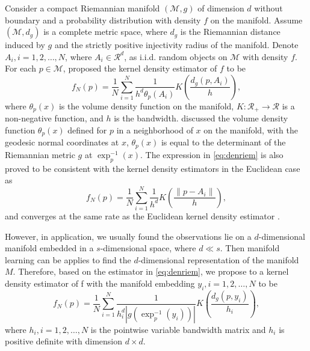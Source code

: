 \documentclass[11pt,a4paper,]{article}
\begin{document}
Consider a compact Riemannian manifold \((\mathcal{M}, g)\) of dimension \(d\) without boundary and a probability distribution with density \(f\) on the manifold. Assume \((\mathcal{M}, d_g)\) is a complete metric space, where \(d_g\) is the Riemannian distance induced by \(g\) and the strictly positive injectivity radius \autocite{Chavel2006-mp} of the manifold. Denote \(A_i, i = 1, 2, \dots, N\), where \(A_i \in \mathcal{R}^d\), as i.i.d. random objects on \(\mathcal{M}\) with density \(f\). For each \(p\in \mathcal{M}\), \textcite{Pelletier2005-vu} proposed the kernel density estimator of \(f\) to be
\begin{equation}
\label{eq:denriem}
f_N(p) = \frac{1}{N} \sum_{i=1}^{N} \frac{1}{h^d \theta_p(A_i)} K(\frac{d_g(p, A_i)}{h}),
\end{equation}
where \(\theta_p(x)\) is the volume density function on the manifold, \(K: \mathcal{R}_{+} \rightarrow \mathcal{R}\) is a non-negative function, and \(h\) is the bandwidth.
\textcite{Pelletier2005-vu} discussed the volume density function \(\theta_p(x)\) defined for \(p\) in a neighborhood of \(x\) on the manifold, with the geodesic normal coordinates at \(x\), \(\theta_p(x)\) is equal to the determinant of the Riemannian metric \(g\) at \(\exp_p^{-1}(x)\). The expression in \eqref{eq:denriem} is also proved to be consistent with the kernel density estimators in the Euclidean case as
\begin{equation}
\label{eq:denconsist}
f_N(p) = \frac{1}{N} \sum_{i=1}^{N} \frac{1}{h^d} K(\frac{\|p-A_i\|}{h}),
\end{equation}
and converges at the same rate as the Euclidean kernel density estimator \autocite{Henry2009-ll}.

However, in application, we usually found the observations lie on a \(d\)-dimensional manifold embedded in a \(s\)-dimensional space, where \(d \ll s\). Then manifold learning can be applies to find the \(d\)-dimensional representation of the manifold \(M\). Therefore, based on the estimator in \eqref{eq:denriem}, we propose to a kernel density estimator of f with the manifold embedding \(y_i, i = 1, 2, \dots, N\) to be
\begin{equation}
\label{eq:denestimator}
f_N(p) = \frac{1}{N} \sum_{i=1}^{N} \frac{1}{h_i^d |g(\exp_p^{-1}(y_i))|} K(\frac{d_g(p, y_i)}{h_i}),
\end{equation}
where \(h_i, i = 1, 2, \dots, N\) is the pointwise variable bandwidth matrix and \(h_i\) is positive definite with dimension \(d\times d\).
\end{document}
